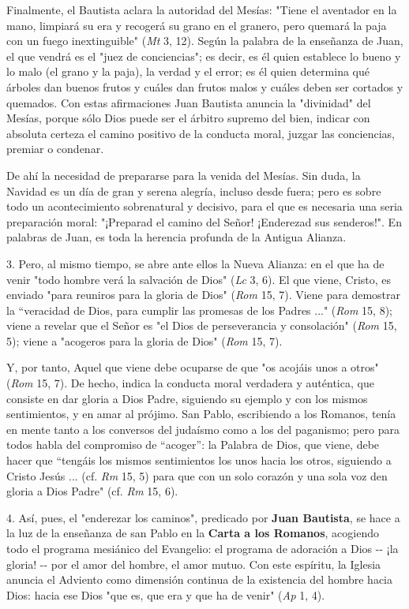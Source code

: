 \begin{body}
\begin{body}
Finalmente, el Bautista aclara la autoridad del Mesías: "Tiene el aventador en la mano, limpiará su era y recogerá su grano en el granero, pero quemará la paja con un fuego inextinguible" (\emph{Mt} 3, 12). Según la palabra de la enseñanza de Juan, el que vendrá es el "juez de conciencias"; es decir, es él quien establece lo bueno y lo malo (el grano y la paja), la verdad y el error; es él quien determina qué árboles dan buenos frutos y cuáles dan frutos malos y cuáles deben ser cortados y quemados. Con estas afirmaciones Juan Bautista anuncia la "divinidad" del Mesías, porque sólo Dios puede ser el árbitro supremo del bien, indicar con absoluta certeza el camino positivo de la conducta moral, juzgar las conciencias, premiar o condenar.

De ahí la necesidad de prepararse para la venida del Mesías. Sin duda, la Navidad es un día de gran y serena alegría, incluso desde fuera; pero es sobre todo un acontecimiento sobrenatural y decisivo, para el que es necesaria una seria preparación moral: "¡Preparad el camino del Señor! ¡Enderezad sus senderos!". En palabras de Juan, es toda la herencia profunda de la Antigua Alianza.

3. Pero, al mismo tiempo, se abre ante ellos la Nueva Alianza: en el que ha de venir "todo hombre verá la salvación de Dios" (\emph{Lc} 3, 6). El que viene, Cristo, es enviado "para reuniros para la gloria de Dios" (\emph{Rom} 15, 7). Viene para demostrar la ``veracidad de Dios, para cumplir las promesas de los Padres ..." (\emph{Rom} 15, 8); viene a revelar que el Señor es "el Dios de perseverancia y consolación" (\emph{Rom} 15, 5); viene a "acogeros para la gloria de Dios" (\emph{Rom} 15, 7).

Y, por tanto, Aquel que viene debe ocuparse de que "os acojáis unos a otros" (\emph{Rom} 15, 7). De hecho, indica la conducta moral verdadera y auténtica, que consiste en dar gloria a Dios Padre, siguiendo su ejemplo y con los mismos sentimientos, y en amar al prójimo. San Pablo, escribiendo a los Romanos, tenía en mente tanto a los conversos del judaísmo como a los del paganismo; pero para todos habla del compromiso de ``acoger'': la Palabra de Dios, que viene, debe hacer que ``tengáis los mismos sentimientos los unos hacia los otros, siguiendo a Cristo Jesús ... (cf. \emph{Rm} 15, 5) para que con un solo corazón y una sola voz den gloria a Dios Padre" (cf. \emph{Rm} 15, 6).

4. Así, pues, el "enderezar los caminos", predicado por \textbf{Juan Bautista}, se hace a la luz de la enseñanza de san Pablo en la \textbf{Carta a los Romanos}, acogiendo todo el programa mesiánico del Evangelio: el programa de adoración a Dios -\/- ¡la gloria! -\/- por el amor del hombre, el amor mutuo. Con este espíritu, la Iglesia anuncia el Adviento como dimensión continua de la existencia del hombre hacia Dios: hacia ese Dios "que es, que era y que ha de venir" (\emph{Ap} 1, 4).


\end{body}
\end{body}

